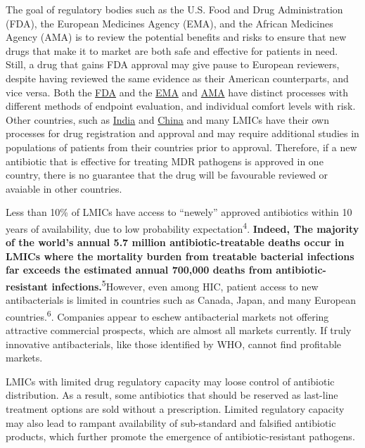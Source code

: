 \documentclass[
]{book}
\begin{document}
The goal of regulatory bodies such as the U.S. Food and Drug Administration (FDA), the European Medicines Agency (EMA), and the African Medicines Agency (AMA) is to review the potential benefits and risks to ensure that new drugs that make it to market are both safe and effective for patients in need. Still, a drug that gains FDA approval may give pause to European reviewers, despite having reviewed the same evidence as their American counterparts, and vice versa. Both the \href{https://www.fda.gov/media/82381/download}{FDA} and the \href{https://www.ema.europa.eu/en/documents/other/laboratory-patient-journey-centrally-authorised-medicine_en.pdf}{EMA} and \href{https://www.ifpma.org/subtopics/african-medicines-agency/}{AMA} have distinct processes with different methods of endpoint evaluation, and individual comfort levels with risk. Other countries, such as \href{https://cdsco.gov.in/opencms/opencms/en/Drugs/New-Drugs/}{India} and \href{https://www.appliedclinicaltrialsonline.com/view/regulatory-requirements-and-key-points-drug-clinical-trials-registration-china}{China} and many LMICs have their own processes for drug registration and approval and may require additional studies in populations of patients from their countries prior to approval. Therefore, if a new antibiotic that is effective for treating MDR pathogens is approved in one country, there is no guarantee that the drug will be favourable reviewed or avaiable in other countries.

Less than 10\% of LMICs have access to ``newely'' approved antibiotics within 10 years of availability, due to low probability expectation\textsuperscript{4}. \textbf{Indeed, The majority of the world's annual 5.7 million antibiotic-treatable deaths occur in LMICs where the mortality burden from treatable bacterial infections far exceeds the estimated annual 700,000 deaths from antibiotic-resistant infections.}\textsuperscript{5}However, even among HIC, patient access to new antibacterials is limited in countries such as Canada, Japan, and many European countries.\textsuperscript{6}. Companies appear to eschew antibacterial markets not offering attractive commercial prospects, which are almost all markets currently. If truly innovative antibacterials, like those identified by WHO, cannot find profitable markets.

LMICs with limited drug regulatory capacity may loose control of antibiotic distribution. As a result, some antibiotics that should be reserved as last-line treatment options are sold without a prescription. Limited regulatory capacity may also lead to rampant availability of sub-standard and falsified antibiotic products, which further promote the emergence of antibiotic-resistant pathogens.
\end{document}
